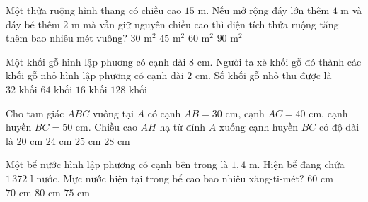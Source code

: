 \begin{ex} %
Một thửa ruộng hình thang có chiều cao $15\text{ m}$. Nếu mở rộng đáy lớn thêm $4\text{ m}$ và đáy bé thêm $2\text{ m}$ mà vẫn giữ nguyên chiều cao thì diện tích thửa ruộng tăng thêm bao nhiêu mét vuông?
\choice
{$30\text{ m}^2$}
{\True $45\text{ m}^2$}
{$60\text{ m}^2$}
{$90\text{ m}^2$}
\end{ex}

\begin{ex} %
Một khối gỗ hình lập phương có cạnh dài $8\text{ cm}$. Người ta xẻ khối gỗ đó thành các khối gỗ nhỏ hình lập phương có cạnh dài $2\text{ cm}$. Số khối gỗ nhỏ thu được là
\choice
{$32\text{ khối}$}
{\True $64\text{ khối}$}
{$16\text{ khối}$}
{$128\text{ khối}$}
\end{ex}

\begin{ex} %
Cho tam giác $ABC$ vuông tại $A$ có cạnh $AB = 30\text{ cm}$, cạnh $AC = 40\text{ cm}$, cạnh huyền $BC = 50\text{ cm}$. Chiều cao $AH$ hạ từ đỉnh $A$ xuống cạnh huyền $BC$ có độ dài là
\choice
{$20\text{ cm}$}
{\True $24\text{ cm}$}
{$25\text{ cm}$}
{$28\text{ cm}$}
\end{ex}

\begin{ex} %
Một bể nước hình lập phương có cạnh bên trong là $1{,}4\text{ m}$. Hiện bể đang chứa $1\,372\text{ l}$ nước. Mực nước hiện tại trong bể cao bao nhiêu xăng-ti-mét?
\choice
{$60\text{ cm}$}
{\True $70\text{ cm}$}
{$80\text{ cm}$}
{$75\text{ cm}$}
\end{ex}


